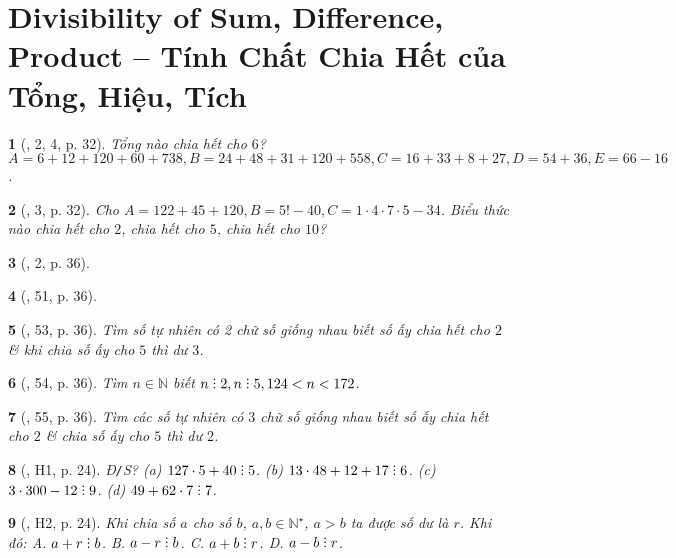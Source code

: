 \documentclass{article}
\newtheorem{baitoan}{}
\DeclareRobustCommand{\divby}{%
	\mathrel{\vbox{\baselineskip.65ex\lineskiplimit0pt\hbox{.}\hbox{.}\hbox{.}}}%
}
\begin{document}
\section{Divisibility of Sum, Difference, Product -- Tính Chất Chia Hết của Tổng, Hiệu, Tích}

\begin{baitoan}[\cite{Trong_Toan_7_2022}, 2, 4, p. 32]
	Tổng nào chia hết cho $6$? $A = 6 + 12 + 120 + 60 + 738,B = 24 + 48 + 31 + 120 + 558,C = 16 + 33 + 8 + 27,D = 54 + 36,E = 66 - 16$.
\end{baitoan}

\begin{baitoan}[\cite{Trong_Toan_7_2022}, 3, p. 32]
	Cho $A = 122 + 45 + 120,B = 5! - 40,C = 1\cdot4\cdot7\cdot5 - 34$. Biểu thức nào chia hết cho $2$, chia hết cho $5$, chia hết cho $10$?
\end{baitoan}

\begin{baitoan}[\cite{Trong_Toan_7_2022}, 2, p. 36]
	
\end{baitoan}

\begin{baitoan}[\cite{Trong_Toan_7_2022}, 51, p. 36]
	
\end{baitoan}

\begin{baitoan}[\cite{Trong_Toan_7_2022}, 53, p. 36]
	Tìm số tự nhiên có 2 chữ số giống nhau biết số ấy chia hết cho $2$ \& khi chia số ấy cho $5$ thì dư $3$.
\end{baitoan}

\begin{baitoan}[\cite{Trong_Toan_7_2022}, 54, p. 36]
	Tìm $n\in\mathbb{N}$ biết $n\divby2,n\divby5,124 < n < 172$.
\end{baitoan}

\begin{baitoan}[\cite{Trong_Toan_7_2022}, 55, p. 36]
	Tìm các số tự nhiên có $3$ chữ số giống nhau biết số ấy chia hết cho $2$ \& chia số ấy cho $5$ thì dư $2$.
\end{baitoan}

\begin{baitoan}[\cite{Binh_boi_duong_Toan_6_tap_1}, H1, p. 24]
	{\rm Đ{\tt/}S? (a) $127\cdot5 + 40\divby5$. (b) $13\cdot48 + 12 + 17\divby6$. (c) $3\cdot300 - 12\divby9$. (d) $49 + 62\cdot7\divby7$.}
\end{baitoan}

\begin{baitoan}[\cite{Binh_boi_duong_Toan_6_tap_1}, H2, p. 24]
	Khi chia số $a$ cho số $b$, $a,b\in\mathbb{N}^\star$, $a > b$ ta được số dư là $r$. Khi đó: {\sf A.} $a + r\divby b$. {\sf B.} $a - r\divby b$. {\sf C.} $a + b\divby r$. {\sf D.} $a - b\divby r$.
\end{baitoan}
\end{document}
